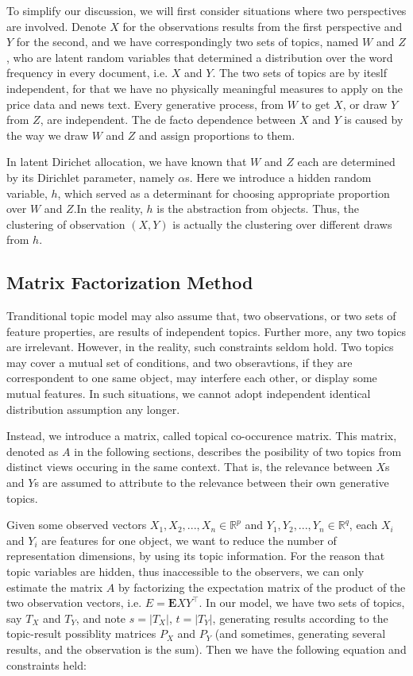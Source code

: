 \documentclass[12pt,a4paper]{article}
\begin{document}
\begin{CJK*}{UTF8}{song}
To simplify our discussion, we will first consider situations where two perspectives are involved. Denote $X$ for the observations results from the first perspective and $Y$ for the second, and we have correspondingly two sets of topics, named $W$ and $Z$, who are latent random variables that determined a distribution over the word frequency in every document, i.e. $X$ and $Y$. The two sets of topics are by iteslf independent, for that we have no physically meaningful measures to apply on the price data and news text. Every generative process, from $W$ to get $X$, or draw $Y$ from $Z$, are independent. The de facto dependence between $X$ and $Y$ is caused by the way we draw $W$ and $Z$ and assign proportions to them.

In latent Dirichet allocation, we have known that $W$ and $Z$ each are determined by its Dirichlet parameter, namely $\alpha$s. Here we introduce a hidden random variable, $h$, which served as a determinant for choosing appropriate proportion over $W$ and $Z$.In the reality, $h$ is the abstraction from objects. Thus, the clustering of observation $(X, Y)$ is actually the clustering over different draws from $h$.

\subsection{Matrix Factorization Method}
Tranditional topic model may also assume that, two observations, or two sets of feature properties, are results of independent topics. Further more, any two topics are irrelevant. However, in the reality, such constraints seldom hold. Two topics may cover a mutual set of conditions, and two obseravtions, if they are correspondent to one same object, may interfere each other, or display some mutual features. In such situations, we cannot adopt independent identical distribution assumption any longer.

Instead, we introduce a matrix, called topical co-occurence matrix. This matrix, denoted as $A$ in the following sections, describes the posibility of two topics from distinct views occuring in the same context. That is, the relevance between $X$s and $Y$s are assumed to attribute to the relevance between their own generative topics.

Given some observed vectors $X_1, X_2, ..., X_n \in \mathbb{R}^p$ and $Y_1, Y_2, ..., Y_n \in \mathbb{R}^q$, each $X_i$ and $Y_i$ are features for one object, we want to reduce the number of representation dimensions, by using its topic information. For the reason that topic variables are hidden, thus inaccessible to the observers, we can only estimate the matrix $A$ by factorizing the expectation matrix of the product of the two observation vectors, i.e. $E = \mathbf{E}XY^\top$. In our model, we have two sets of topics, say $T_X$ and $T_Y$, and note $s = |T_X|$, $t = |T_Y|$, generating results according to the topic-result possiblity matrices $P_X$ and $P_Y$ (and sometimes, generating several results, and the observation is the sum). Then we have the following equation and constraints held:


\end{CJK*}
\end{document}
